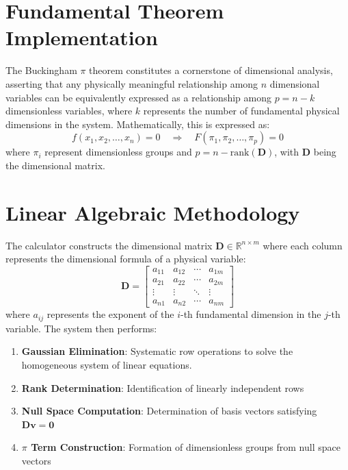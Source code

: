 \section{Fundamental Theorem Implementation}

The Buckingham $\pi$ theorem constitutes a cornerstone of dimensional analysis, asserting that any physically meaningful relationship among $n$ dimensional variables can be equivalently expressed as a relationship among $p = n - k$ dimensionless variables, where $k$ represents the number of fundamental physical dimensions in the system. Mathematically, this is expressed as:
\begin{equation}
f(x_1, x_2, \ldots, x_n) = 0 \quad \Rightarrow \quad F(\pi_1, \pi_2, \ldots, \pi_p) = 0
\end{equation}
where $\pi_i$ represent dimensionless groups and $p = n - \text{rank}(\mathbf{D})$, with $\mathbf{D}$ being the dimensional matrix.

\section{Linear Algebraic Methodology}

The calculator constructs the dimensional matrix $\mathbf{D} \in \mathbb{R}^{n \times m}$ where each column represents the dimensional formula of a physical variable:
\begin{equation}
\mathbf{D} = \begin{bmatrix}
a_{11} & a_{12} & \cdots & a_{1m} \\
a_{21} & a_{22} & \cdots & a_{2m} \\
\vdots & \vdots & \ddots & \vdots \\
a_{n1} & a_{n2} & \cdots & a_{nm}
\end{bmatrix}
\end{equation}
where $a_{ij}$ represents the exponent of the $i$-th fundamental dimension in the $j$-th variable. The system then performs:
\begin{enumerate}
    \item \textbf{Gaussian Elimination}: Systematic row operations to solve the homogeneous system of linear equations.
    \item \textbf{Rank Determination}: Identification of linearly independent rows
    \item \textbf{Null Space Computation}: Determination of basis vectors satisfying $\mathbf{D}\mathbf{v} = \mathbf{0}$
    \item \textbf{$\pi$ Term Construction}: Formation of dimensionless groups from null space vectors
\end{enumerate}

